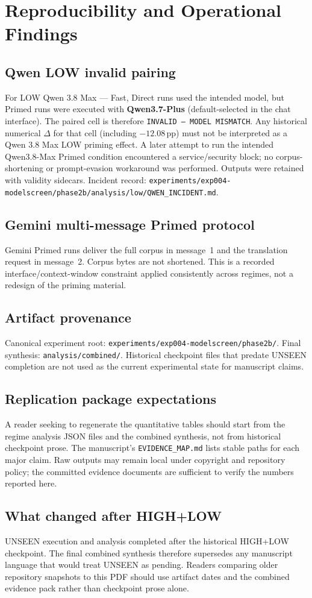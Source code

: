 \section{Reproducibility and Operational Findings}
\label{sec:repro}

\subsection{Qwen LOW invalid pairing}
For LOW Qwen 3.8 Max --- Fast, Direct runs used the intended model, but Primed runs were executed with \textbf{Qwen3.7-Plus} (default-selected in the chat interface).
The paired cell is therefore \texttt{INVALID --- MODEL MISMATCH}.
Any historical numerical $\Delta$ for that cell (including $-12.08$\,pp) must not be interpreted as a Qwen 3.8 Max LOW priming effect.
A later attempt to run the intended Qwen3.8-Max Primed condition encountered a service/security block; no corpus-shortening or prompt-evasion workaround was performed.
Outputs were retained with validity sidecars.
Incident record: \texttt{experiments/exp004-modelscreen/phase2b/analysis/low/QWEN\_INCIDENT.md}.

\subsection{Gemini multi-message Primed protocol}
Gemini Primed runs deliver the full corpus in message~1 and the translation request in message~2.
Corpus bytes are not shortened.
This is a recorded interface/context-window constraint applied consistently across regimes, not a redesign of the priming material.

\subsection{Artifact provenance}
Canonical experiment root: \texttt{experiments/exp004-modelscreen/phase2b/}.
Final synthesis: \texttt{analysis/combined/}.
Historical checkpoint files that predate UNSEEN completion are not used as the current experimental state for manuscript claims.


\subsection{Replication package expectations}
A reader seeking to regenerate the quantitative tables should start from the regime analysis JSON files and the combined synthesis, not from historical checkpoint prose.
The manuscript's \texttt{EVIDENCE\_MAP.md} lists stable paths for each major claim.
Raw outputs may remain local under copyright and repository policy; the committed evidence documents are sufficient to verify the numbers reported here.


\subsection{What changed after HIGH+LOW}
UNSEEN execution and analysis completed after the historical HIGH+LOW checkpoint.
The final combined synthesis therefore supersedes any manuscript language that would treat UNSEEN as pending.
Readers comparing older repository snapshots to this PDF should use artifact dates and the combined evidence pack rather than checkpoint prose alone.
